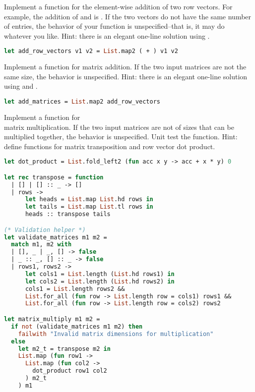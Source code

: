 Implement a function  for the element-wise addition of two row vectors. For example, the addition of \code{[1; 1; 1]} and \code{[9; 8; 7]} is \code{[10; 9; 8]}. If the two vectors do not have the same number of entries, the behavior of your function is unspecified--that is, it may do whatever you like. Hint: there is an elegant one-line solution using .

\begin{lstlisting}[language=OCaml]
let add_row_vectors v1 v2 = List.map2 ( + ) v1 v2
\end{lstlisting}

Implement a function  for matrix addition. If the two input matrices are not the same size, the behavior is unspecified. Hint: there is an elegant one-line solution using  and .

\begin{lstlisting}[language=OCaml]
let add_matrices = List.map2 add_row_vectors
\end{lstlisting}

Implement a function  for \\ matrix multiplication. If the two input matrices are not of sizes that can be multiplied together, the behavior is unspecified. Unit test the function. Hint: define functions for matrix transposition and row vector dot product.

\begin{lstlisting}[language=OCaml]
let dot_product = List.fold_left2 (fun acc x y -> acc + x * y) 0

let rec transpose = function
  | [] | [] :: _ -> []
  | rows ->
      let heads = List.map List.hd rows in
      let tails = List.map List.tl rows in
      heads :: transpose tails

(* Validation helper *)
let validate_matrices m1 m2 =
  match m1, m2 with
  | [], _ | _, [] -> false
  | _ :: _, [] :: _ -> false
  | rows1, rows2 ->
      let cols1 = List.length (List.hd rows1) in
      let cols2 = List.length (List.hd rows2) in
      cols1 = List.length rows2 &&
      List.for_all (fun row -> List.length row = cols1) rows1 &&
      List.for_all (fun row -> List.length row = cols2) rows2

let matrix_multiply m1 m2 =
  if not (validate_matrices m1 m2) then
    failwith "Invalid matrix dimensions for multiplication"
  else
    let m2_t = transpose m2 in
    List.map (fun row1 ->
      List.map (fun col2 ->
        dot_product row1 col2
      ) m2_t
    ) m1
\end{lstlisting}